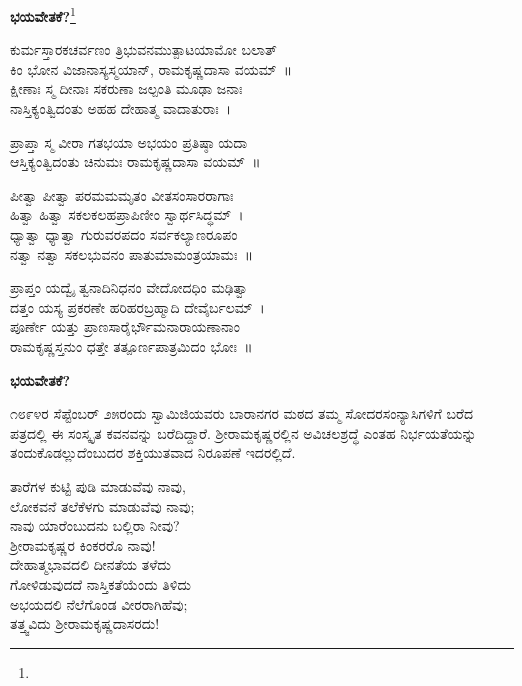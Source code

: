 \begin{center}
\textbf{ಭಯವೇತಕೆ?}\footnote{}
\end{center}

\begin{myquote}
ಕುರ್ಮಸ್ತಾರಕಚರ್ವಣಂ ತ್ರಿಭುವನಮುತ್ಪಾಟಯಾಮೋ ಬಲಾತ್\\ಕಿಂ ಭೋನ ವಿಜಾನಾಸ್ಯಸ್ಮಯಾನ್, ರಾಮಕೃಷ್ಣದಾಸಾ ವಯಮ್~॥\\ಕ್ಷೀಣಾಃ ಸ್ಮ ದೀನಾಃ ಸಕರುಣಾ ಜಲ್ಪಂತಿ ಮೂಢಾ ಜನಾಃ\\ನಾಸ್ತಿಕ್ಯಂತ್ವಿದಂತು ಅಹಹ ದೇಹಾತ್ಮ ವಾದಾತುರಾಃ~।
\end{myquote}

\begin{myquote}
ಪ್ರಾಪ್ತಾ ಸ್ಮ ವೀರಾ ಗತಭಯಾ ಅಭಯಂ ಪ್ರತಿಷ್ಠಾ ಯದಾ\\ಆಸ್ತಿಕ್ಯಂತ್ವಿದಂತು ಚಿನುಮಃ ರಾಮಕೃಷ್ಣದಾಸಾ ವಯಮ್~॥
\end{myquote}

\begin{myquote}
ಪೀತ್ವಾ ಪೀತ್ವಾ ಪರಮಮಮೃತಂ ವೀತಸಂಸಾರರಾಗಾಃ\\ಹಿತ್ವಾ ಹಿತ್ವಾ ಸಕಲಕಲಹಪ್ರಾಪಿಣೀಂ ಸ್ವಾರ್ಥಸಿದ್ಧಮ್~।\\ಧ್ಯಾತ್ವಾ ಧ್ಯಾತ್ವಾ ಗುರುವರಪದಂ ಸರ್ವಕಲ್ಯಾಣರೂಪಂ\\ನತ್ವಾ ನತ್ವಾ ಸಕಲಭುವನಂ ಪಾತುಮಾಮಂತ್ರಯಾಮಃ~॥
\end{myquote}

\begin{myquote}
ಪ್ರಾಪ್ತಂ ಯದ್ವೈ ತ್ವನಾದಿನಿಧನಂ ವೇದೋದಧಿಂ ಮಢಿತ್ವಾ\\ದತ್ತಂ ಯಸ್ಯ ಪ್ರಕರಣೇ ಹರಿಹರಬ್ರಹ್ಮಾದಿ ದೇವೈರ್ಬಲಮ್~।\\
ಪೂರ್ಣೇ ಯತ್ತು ಪ್ರಾಣಸಾರೈರ್ಭೌಮನಾರಾಯಣಾನಾಂ\\ರಾಮಕೃಷ್ಣಸ್ತನುಂ ಧತ್ತೇ ತತ್ಪೂರ್ಣಪಾತ್ರಮಿದಂ ಭೋಃ~॥
\end{myquote}

\begin{center}
\textbf{ಭಯವೇತಕೆ?}
\end{center}

೧೮೯೪ರ ಸೆಪ್ಟೆಂಬರ್ ೨೫ರಂದು ಸ್ವಾಮಿಜಿಯವರು ಬಾರಾನಗರ ಮಠದ ತಮ್ಮ ಸೋದರಸಂನ್ಯಾಸಿಗಳಿಗೆ ಬರೆದ ಪತ್ರದಲ್ಲಿ ಈ ಸಂಸ್ಕೃತ ಕವನವನ್ನು ಬರೆದಿದ್ದಾರೆ. ಶ‍್ರೀರಾಮಕೃಷ್ಣರಲ್ಲಿನ ಅವಿಚಲಶ್ರದ್ಧೆ ಎಂತಹ ನಿರ್ಭಯತೆಯನ್ನು ತಂದುಕೊಡಲ್ಲುದೆಂಬುದರ ಶಕ್ತಿಯುತವಾದ ನಿರೂಪಣೆ ಇದರಲ್ಲಿದೆ.

\begin{myquote}
ತಾರೆಗಳ ಕುಟ್ಟಿ ಪುಡಿ ಮಾಡುವೆವು ನಾವು,\\ಲೋಕವನೆ ತಲೆಕೆಳಗು ಮಾಡುವೆವು ನಾವು;\\ನಾವು ಯಾರೆಂಬುದನು ಬಲ್ಲಿರಾ ನೀವು?\\ಶ‍್ರೀರಾಮಕೃಷ್ಣರ ಕಿಂಕರರೊ ನಾವು!\\ದೇಹಾತ್ಮಭಾವದಲಿ ದೀನತೆಯ ತಳೆದು\\ಗೋಳಿಡುವುದದೆ ನಾಸ್ತಿಕತೆಯೆಂದು ತಿಳಿದು\\ಅಭಯದಲಿ ನೆಲೆಗೊಂಡ ವೀರರಾಗಿಹೆವು;\\ತತ್ತ್ವವಿದು ಶ‍್ರೀರಾಮಕೃಷ್ಣದಾಸರದು!
\end{myquote}

